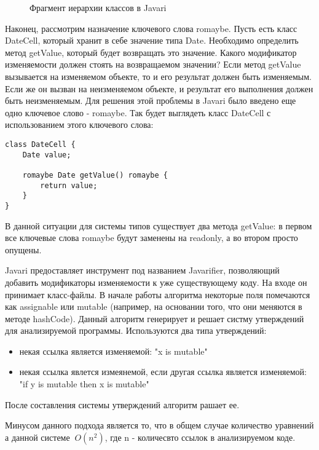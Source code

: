 \begin{figure}[h]
\caption{Фрагмент иерархии классов в Javari}
\label{pic:javari_list_classes}
\end{figure}


Наконец, рассмотрим назначение ключевого слова romaybe. Пусть есть класс DateCell, который хранит в себе значение типа Date. Необходимо определить метод getValue, который будет возвращать это значение. Какого модификатор изменяемости должен стоять на возвращаемом значении? Если метод getValue вызывается на изменяемом объекте, то и его результат должен быть изменяемым. Если же он вызван на неизменяемом объекте, и результат его выполнения должен быть неизменяемым. Для решения этой проблемы в Javari было введено еще одно ключевое слово - romaybe. Так будет выглядеть класс DateCell с использованием этого ключевого слова:

\begin{lstlisting}[caption=Ключевое слово romaybe, label=code:javari_romaybe]
class DateCell { 
    Date value; 
    
    romaybe Date getValue() romaybe { 
        return value; 
    }
}
\end{lstlisting}

В данной ситуации для системы типов существует два метода getValue: в первом все ключевые слова romaybe будут заменены на readonly, а во втором просто опущены. 

Javari предоставляет инструмент под названием Javarifier, позволяющий добавить модификаторы изменяемости к уже существующему коду. На входе он принимает класс-файлы. В начале работы алгоритма некоторые поля помечаются как assignable или mutable (например, на основании того, что они меняются в методе hashCode). Данный алгоритм генерирует и решает систму утверждений для анализируемой программы. Используются два типа утверждений:
\begin{itemize}
	
	\item некая ссылка является изменяемой: "x is mutable"
	
	\item некая ссылка явлется измеянемой, если другая ссылка является изменяемой: "if y is mutable then x is mutable"
	
\end{itemize}
После составления системы утверждений алгоритм рашает ее.

Минусом данного подхода является то, что в общем случае количество уравнений а данной системе $~O(n^2)$, где n - количесвто ссылок в анализируемом коде. 

